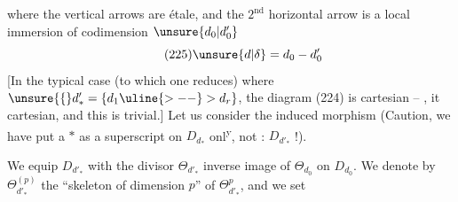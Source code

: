 where the vertical arrows are étale,
and the $2^{\mathrm{nd}}$ horizontal arrow is a
local immersion of codimension $\unsure{d_0|d^{\prime}_0}$
\[
\tag{225}\unsure{d|\delta}=d_0-d'_0
\]
[In the typical case (to which one reduces)
where $\unsure{\{}d'_* = \{d_1\uline{>--} >d_r\}$, the diagram
(224) is cartesian -- , it
  cartesian,  and this is trivial.]
Let us consider the induced morphism
(Caution, we have put a $*$ as a superscript
on $D_{d_*}$ onl\textsuperscript{y}, not : $D_{d'_*}$ !).

We equip $D_{d'_*}$ with the divisor
$\Theta_{d'_*}$ inverse image of $\Theta_{d_0}$ on $D_{d_0}$.
We denote by $\Theta_{d'_*}^{(p)}$ the ``skeleton
of dimension $p$'' of $\Theta_{d'_*}^{p}$, and  we set
